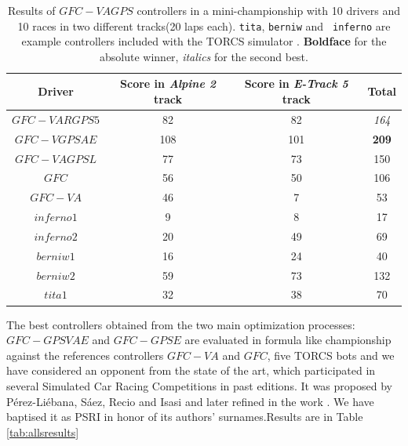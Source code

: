 \documentclass[10pt,journal,compsoc]{IEEEtran}
\begin{document}
%
\begin{table}[ht]
	\centering
	{\scriptsize
		\caption{ Results of $GFC-VAGPS$ controllers in a mini-championship with 10 drivers and 10
			races in two different tracks(20 laps each). {\tt tita}, {\tt berniw} and {\tt
				inferno} are example controllers included with the TORCS
			simulator \cite{torcs4}. {\bf Boldface}
                      for the absolute winner, {\em italics} for the second
                    best.}
		{
			\begin{tabular}{|c|c|c||c|}
				\hline
				Driver&Score in \textit{Alpine 2} track &Score in \textit{E-Track 5} track &Total\\
				\hline
				\hline	
				$GFC-VARGPS5$&	82&	82&	{\em 164}\\
				$GFC-VGPSAE$&	108&    101&	{\bf 209}\\
				$GFC-VAGPSL$&	77&	73&	150\\
				$GFC$&	56&	50&	106\\
				$GFC-VA$&	46&	7&	53\\
				$inferno1$&	9&	8&	17\\
				$inferno2$&	20&	49&	69\\
				$berniw1$&	16&	24&	40\\
				$berniw2$&	59&	73&	132\\
				$tita1$&	32&	38&	70\\			
				\hline
				
			\end{tabular}
		}\label{tab:VaryingalphaRSresults}
	}
\end{table}
%
The best controllers obtained from the two main optimization processes: $GFC-GPSVAE$ and $GFC-GPSE$ are evaluated in formula like championship against the references controllers $GFC-VA$ and $GFC$, five TORCS bots and we have considered an opponent from the state of the art, which participated in several Simulated Car Racing Competitions in past editions. 
It was proposed by P{\'e}rez-Li{\'e}bana, S{\'a}ez, Recio and Isasi \cite{EvolvingRuleSystem08} and later refined in the work \cite{PerezEvolvingFuzzy09}. We have baptised it as PSRI in honor of its authors' surnames.Results are in Table \ref{tab:allsresults}
%
\end{document}
